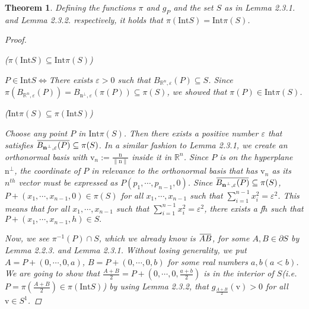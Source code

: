 \documentclass[a4paper]{article}
\newtheorem{thm}{Theorem}[subsection]
\newcommand{\overbar}[1]{\mkern 1.5mu\overline{\mkern-1.5mu#1\mkern-1.5mu}\mkern 1.5mu}
\theoremstyle{definition}
\begin{document}
\begin{thm} Defining the functions $\pi$ and $g_P$ and the set $S$ as in Lemma 2.3.1. and Lemma 2.3.2. respectively, it holds that $\pi(\mathrm{Int}S)=\mathrm{Int}\pi(S)$.
\begin{proof}
\begin{flushleft} ($\pi(\mathrm{Int}S)\subseteq\mathrm{Int}\pi(S)$)\end{flushleft}
$P\in\mathrm{Int}S\Leftrightarrow$There exists $\varepsilon>0$ such that $B_{\mathbb{R}^n,\varepsilon}(P)\subseteq S$. Since $\pi(B_{\mathbb{R}^n,\varepsilon}(P))=B_{\boldsymbol{\mathrm{n}}^{\perp},\varepsilon}(\pi(P))\subseteq \pi(S)$, we showed that $\pi(P)\in\mathrm{Int}\pi(S)$.
\begin{flushleft} ($\mathrm{Int}\pi(S)\subseteq \pi(\mathrm{Int}S)$)\end{flushleft}
Choose any point $P$ in $\mathrm{Int}\pi(S)$. Then there exists a positive number $\varepsilon$ that satisfies $\overbar{B_{\boldsymbol{\mathrm{n}}^{\perp},\varepsilon}(P)}\subseteq \pi(S)$. In a similar fashion to Lemma 2.3.1, we create an orthonormal basis with $\boldsymbol{\mathrm{v}}_n:=\frac{\boldsymbol{\mathrm{n}}}{\|\boldsymbol{\mathrm{n}}\|}$ inside it in $\mathbb{R}^n$. Since $P$ is on the hyperplane $\boldsymbol{\mathrm{n}}^{\perp}$, the coordinate of $P$ in relevance to the orthonormal basis that has $\boldsymbol{\mathrm{v}}_n$ as its $n^{th}$ vector must be expressed as $P(p_1,\cdots,p_{n-1},0)$.
Since $\overbar{B_{\boldsymbol{\mathrm{n}}^{\perp},\varepsilon}(P)}\subseteq \pi(S)$, $P+(x_1,\cdots,x_{n-1},0)\in \pi(S)$ for all $x_1,\cdots,x_{n-1}$ such that $\sum\limits_{i=1}^{n-1} x_i^2=\varepsilon^2$. This means that for all $x_1,\cdots,x_{n-1}$ such that $\sum\limits_{i=1}^{n-1} x_i^2=\varepsilon^2$, there exists a f$h$ such that $P+(x_1,\cdots,x_{n-1},h)\in S.$

Now, we see $\pi^{-1}(P)\cap S$, which we already know is $\overbar{AB}$, for some $A,B\in\partial S$ by Lemma 2.2.3. and Lemma 2.3.1. Without losing generality, we put $A=P+(0,\cdots,0,a)$, $B=P+(0,\cdots,0,b)$ for some real numbers $a,b(a<b)$. We are going to show that $\frac{A+B}{2}=P+(0,\cdots,0,\frac{a+b}{2})$ is in the interior of $S$(i.e. $P=\pi(\frac{A+B}{2})\in \pi(\mathrm{Int}S)$) by using Lemma 2.3.2, that $g_{\frac{A+B}{2}}(\boldsymbol{\mathrm{v}})>0$ for all $\boldsymbol{\mathrm{v}}\in S^1$.


\end{proof}
\end{thm}
\end{document}
